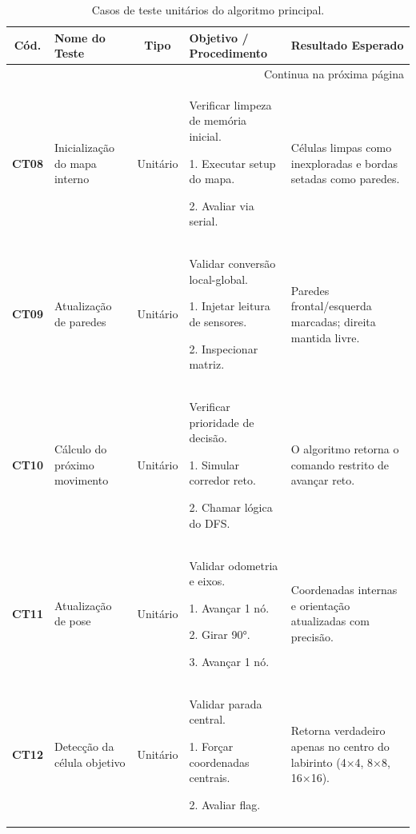 \begin{landscape}
\begin{center}
\begin{longtable}{|c|p{4.5cm}|c|p{8cm}|p{6cm}|}
\caption{Casos de teste unitários do algoritmo principal.} \label{tab:testes_unitarios_alg} \\
\hline
\textbf{Cód.} & \textbf{Nome do Teste} & \textbf{Tipo} & \textbf{Objetivo / Procedimento} & \textbf{Resultado Esperado} \\ \hline
\endhead
\hline \multicolumn{5}{|r|}{{Continua na próxima página}} \\ \hline
\endfoot
\hline \hline
\endlastfoot

\textbf{CT08} & Inicialização do mapa interno & Unitário & Verificar limpeza de memória inicial. \par 1. Executar setup do mapa. \par 2. Avaliar via serial. & Células limpas como inexploradas e bordas setadas como paredes. \\ \hline
\textbf{CT09} & Atualização de paredes & Unitário & Validar conversão local-global. \par 1. Injetar leitura de sensores. \par 2. Inspecionar matriz. & Paredes frontal/esquerda marcadas; direita mantida livre. \\ \hline
\textbf{CT10} & Cálculo do próximo movimento & Unitário & Verificar prioridade de decisão. \par 1. Simular corredor reto. \par 2. Chamar lógica do DFS. & O algoritmo retorna o comando restrito de avançar reto. \\ \hline
\textbf{CT11} & Atualização de pose & Unitário & Validar odometria e eixos. \par 1. Avançar 1 nó. \par 2. Girar 90°. \par 3. Avançar 1 nó. & Coordenadas internas e orientação atualizadas com precisão. \\ \hline
\textbf{CT12} & Detecção da célula objetivo & Unitário & Validar parada central. \par 1. Forçar coordenadas centrais. \par 2. Avaliar flag. & Retorna verdadeiro apenas no centro do labirinto (4×4, 8×8, 16×16). \\ \hline
\end{longtable}
\end{center}


\end{landscape}
